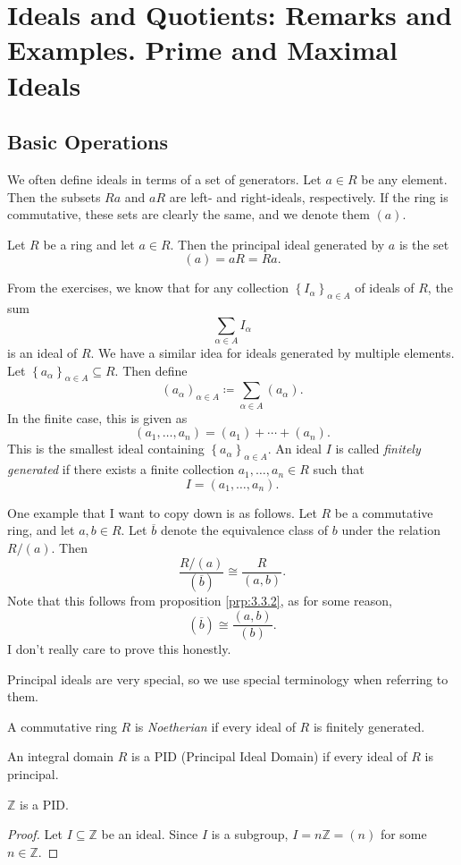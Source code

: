 \section{Ideals and Quotients: Remarks and Examples. Prime and Maximal Ideals}
\subsection{Basic Operations}
We often define ideals in terms of a set of generators. Let $a\in R$ be any element. Then the subsets $Ra$ and $aR$ are left- and right-ideals, respectively. If the ring is commutative, these sets are clearly the same, and we denote them $(a)$.
\begin{definition}\label{dfn:3.4.1}
	Let $R$ be a ring and let $a\in R$. Then the principal ideal generated by $a$ is the set
	\[
		(a)=aR=Ra
	.\]
\end{definition}

From the exercises, we know that for any collection $\left\{ I_\alpha  \right\}_{\alpha \in A}$ of ideals of $R$, the sum
\[
	\sum_{\alpha\in A } I_\alpha 
\]
is an ideal of $R$. We have a similar idea for ideals generated by multiple elements. Let $\left\{ a_{\alpha } \right\}_{\alpha \in A}\subseteq R$. Then define
\[
	\left( a_{\alpha } \right)_{\alpha \in A}\coloneqq \sum_{\alpha \in A} \left( a_{\alpha } \right) 
.\]
In the finite case, this is given as
\[
	\left( a_1, \dots, a_n  \right) =(a_1)+\cdots +(a_n)
.\]
This is the smallest ideal containing $\left\{ a_{\alpha } \right\}_{\alpha \in A}$. An ideal $I$ is called \emph{finitely generated} if there exists a finite collection $a_1, \dots, a_n \in R$ such that
\[
	I=\left( a_1, \dots, a_n  \right) 
.\]

One example that I want to copy down is as follows. Let $R$ be a commutative ring, and let $a,b\in R$. Let $\overline{b}  $ denote the equivalence class of $b$ under the relation $R /(a)$. Then
\[
	\frac{R /(a)}{(\overline{b} )}\cong \frac{R}{(a,b)}
.\]
Note that this follows from proposition \ref{prp:3.3.2}, as for some reason,
\[
	(\overline{b} )\cong \frac{(a,b)}{(b)}
.\]
I don't really care to prove this honestly.

Principal ideals are very special, so we use special terminology when referring to them.
\begin{definition}[Noetherian]\label{dfn:3.3.2}
	A commutative ring $R$ is \emph{Noetherian} if every ideal of $R$ is finitely generated.
\end{definition}
\begin{definition}\label{dfn:3.4.3}
	An integral domain $R$ is a PID (Principal Ideal Domain) if every ideal of $R$ is principal.
\end{definition}
\begin{proposition}\label{prp:3.4.1}
	$\mathbb{Z}$ is a PID.
\end{proposition}
\begin{proof}
	Let $I\subseteq \mathbb{Z}$ be an ideal. Since $I$ is a subgroup, $I=n\mathbb{Z}=(n)$ for some $n\in\mathbb{Z}$.
\end{proof}

